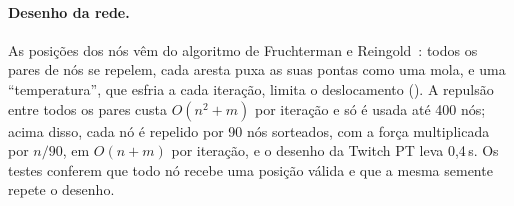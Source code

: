 \paragraph{Desenho da rede.} As posições dos nós vêm do algoritmo de Fruchterman e
Reingold~\cite{fruchterman1991}: todos os pares de nós se repelem, cada aresta puxa as suas pontas
como uma mola, e uma ``temperatura'', que esfria a cada iteração, limita o deslocamento
(). A repulsão entre todos os pares custa $O(n^2 + m)$ por iteração e só
é usada até 400 nós; acima disso, cada nó é repelido por 90 nós sorteados, com a força multiplicada
por $n/90$, em $O(n + m)$ por iteração, e o desenho da Twitch PT leva 0,4\,s. Os testes conferem que
todo nó recebe uma posição válida e que a mesma semente repete o desenho.
